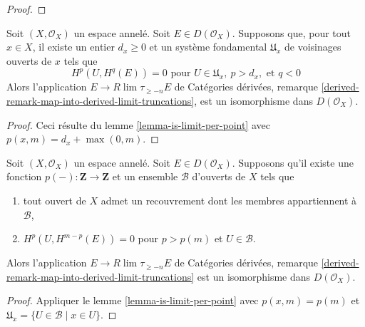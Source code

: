 {\begin{proof}
\end{proof}

\begin{lemma}

\label{lemma-is-limit-spaltenstein}

\begin{reference}
\cite[proposition 3.13]{Spaltenstein}
\end{reference}
Soit $(X, \mathcal{O}_X)$ un espace annelé. Soit $E \in D(\mathcal{O}_X)$. Supposons que, pour tout $x \in X$, il existe un entier $d_x \geq 0$ et un système fondamental $\mathfrak{U}_x$ de voisinages ouverts de $x$ tels que $$
H^p(U, H^q(E)) = 0 \text{ pour }
U \in \mathfrak{U}_x,\ p > d_x, \text{ et }q < 0
$$ Alors l'application $E \to R\lim \tau_{\geq -n} E$ de Catégories dérivées, remarque \ref{derived-remark-map-into-derived-limit-truncations}, est un isomorphisme dans $D(\mathcal{O}_X)$.
\end{lemma}

\begin{proof}
Ceci résulte du lemme \ref{lemma-is-limit-per-point} avec $p(x, m) = d_x + \max(0, m)$.
\end{proof}

\begin{lemma}

\label{lemma-is-limit}

Soit $(X, \mathcal{O}_X)$ un espace annelé. Soit $E \in D(\mathcal{O}_X)$. Supposons qu'il existe une fonction $p(-) : \mathbf{Z} \to \mathbf{Z}$
et un ensemble $\mathcal{B}$ d'ouverts de $X$ tels que

\begin{enumerate}

\item tout ouvert de $X$ admet un recouvrement dont les membres appartiennent à $\mathcal{B}$,
\item  $H^p(U, H^{m - p}(E)) = 0$ pour $p > p(m)$ et $U \in \mathcal{B}$.

\end{enumerate}

Alors l'application $E \to R\lim \tau_{\geq -n} E$ de Catégories dérivées, remarque
\ref{derived-remark-map-into-derived-limit-truncations}
est un isomorphisme dans $D(\mathcal{O}_X)$.

\end{lemma}

\begin{proof}
Appliquer le lemme \ref{lemma-is-limit-per-point} avec $p(x, m) = p(m)$ et $\mathfrak{U}_x = \{U \in \mathcal{B} \mid x \in U\}$.
\end{proof}

}
